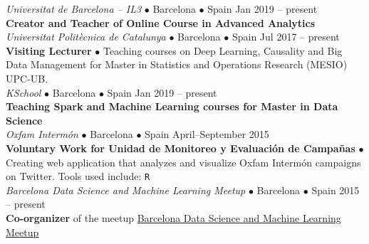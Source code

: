 \documentclass[a4paper, oneside]{scrreprt}
\begin{document}
\vspace{-0.3cm}
\noindent{}\textit{Universitat de Barcelona -- IL3} $\bullet$ 
Barcelona $\bullet$ Spain \hfill Jan 2019 -- present\\
\noindent\textbf{\small Creator and Teacher of Online Course in Advanced Analytics} \\

\vspace{-0.3cm}
\noindent{}\textit{Universitat Politècnica de Catalunya} $\bullet$ 
Barcelona $\bullet$ Spain \hfill Jul 2017 -- present\\
\noindent\textbf{\small Visiting Lecturer} $\bullet$ Teaching courses on Deep Learning, Causality and
Big Data Management for Master in Statistics and Operations Research (MESIO) UPC-UB. \\

\vspace{-0.3cm}
\noindent{}\textit{KSchool} $\bullet$ 
Barcelona $\bullet$ Spain \hfill Jan 2019 -- present\\
\noindent\textbf{\small Teaching Spark and Machine Learning courses for Master in Data Science} \\

\vspace{-0.3cm}
\noindent{}\textit{Oxfam Intermón} $\bullet$ 
Barcelona $\bullet$ Spain \hfill April--September 2015\\
\noindent\textbf{\small Voluntary Work for Unidad de Monitoreo y Evaluación de Campañas} $\bullet$ 
{\small Creating web application that analyzes and visualize Oxfam Intermón
  campaigns on Twitter.  Tools used
  include: \texttt{R}}\\

\vspace{-0.3cm}
\noindent{}\textit{Barcelona Data Science and Machine Learning Meetup}
$\bullet$ Barcelona $\bullet$ Spain \hfill 2015 -- present\\
\noindent  \textbf{Co-organizer} of the meetup
  \href{https://www.meetup.com/es-ES/barcelona-data-science-machine-learning/}
  {Barcelona Data Science and Machine Learning Meetup}

\vspace{-0.3cm}
\noindent\makebox[\linewidth]{\rule{\textwidth}{0.4pt}}

  
\end{document}
